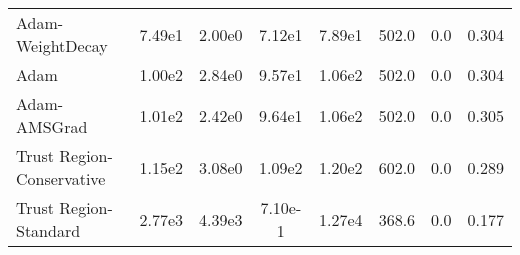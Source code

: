 \documentclass{article}
\begin{document}
\begin{table}[htbp]
{\begin{tabular}{l*{7}{S[table-format=2.2e-1]}}
Adam-WeightDecay & 7.49e1 & 2.00e0 & 7.12e1 & 7.89e1 & 502.0 & 0.0 & 0.304 \\
Adam & 1.00e2 & 2.84e0 & 9.57e1 & 1.06e2 & 502.0 & 0.0 & 0.304 \\
Adam-AMSGrad & 1.01e2 & 2.42e0 & 9.64e1 & 1.06e2 & 502.0 & 0.0 & 0.305 \\
Trust Region-Conservative & 1.15e2 & 3.08e0 & 1.09e2 & 1.20e2 & 602.0 & 0.0 & 0.289 \\
Trust Region-Standard & 2.77e3 & 4.39e3 & 7.10e-1 & 1.27e4 & 368.6 & 0.0 & 0.177 \\
\bottomrule
\end{tabular}
}
\end{table}
\end{document}
